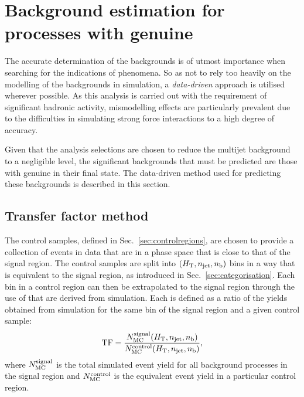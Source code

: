 
\section{Background estimation for processes with genuine \MET} %
\label{sec:bkgdMet}

The accurate determination of the \SM backgrounds is of utmost
importance when searching for the indications of \BSM phenomena. So as
not to rely too heavily on the modelling of the backgrounds in
simulation, a \emph{data-driven} approach is utilised wherever
possible. As this analysis is carried out with the requirement of
significant hadronic activity, mismodelling effects are particularly
prevalent due to the difficulties in simulating strong force
interactions to a high degree of accuracy.

Given that the analysis selections are chosen to reduce the \QCD
multijet background to a negligible level, the significant \SM
backgrounds that must be predicted are those with genuine \MET in
their final state. The data-driven method used for predicting these
backgrounds is described in this section.

\subsection{Transfer factor method}
\label{sec:TF}

The control samples, defined in Sec.~\ref{sec:controlregions}, are
chosen to provide a collection of events in data that are in a phase
space that is close to that of the signal region. The control samples
are split into $(\mbox{$H_\text{T}$},n_{\mathrm{jet}},n_{\text{b}})$ bins in a way that is equivalent to the
signal region, as introduced in Sec.~\ref{sec:categorisation}. Each
bin in a control region can then be extrapolated to the signal region
through the use of \emph{\TFs} that are derived from
simulation.  Each \TF is defined as a ratio of the yields
obtained from \MC simulation for the same bin of the signal region and
a given control sample:
\begin{equation}
  \label{equ:tf-ratio}
  {\rm TF} = \frac{N_{\rm MC}^{\rm signal}(\mbox{$H_\text{T}$},n_{\mathrm{jet}},n_{\text{b}})}{N_{\rm
      MC}^{\rm control}(\mbox{$H_\text{T}$},n_{\mathrm{jet}},n_{\text{b}})}, 
\end{equation}
where $N_{\rm MC}^{\rm signal}$ is the total simulated event yield for
all background processes in the signal region and $N_{\rm MC}^{\rm
control}$ is the equivalent event yield in a particular control
region.

